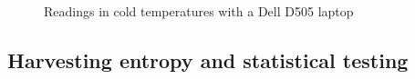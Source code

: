 \documentclass[a4paper]{article}           %
\begin{document}

  \begin{figure}[h!]
    \centering  

    \caption{Readings in cold temperatures with a Dell D505 laptop}
    \label{fig:ardcold}
        
  \end{figure}
 


\FloatBarrier
\subsection{Harvesting entropy and statistical testing}
\label{sec:harvest}
\end{document}
